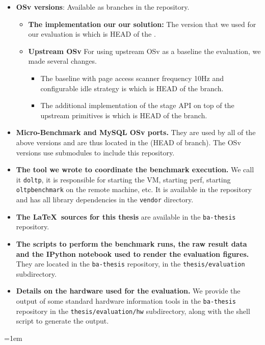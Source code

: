 \documentclass[12pt,a4paper]{book}
\begin{document}
\begin{itemize}
    \item \textbf{OSv versions}:
        Available as branches in the  repository.
    \begin{itemize}
        \item \textbf{The implementation our our solution:}
            The version that we used for our evaluation is  which is HEAD of the .
        \item \textbf{Upstream OSv}
            For using upstream OSv as a baseline the evaluation, we made several changes.
            \begin{itemize}
                \item The baseline with page access scanner frequency 10Hz and configurable idle strategy is  which is HEAD of the  branch.

                \item The additional implementation of the stage API on top of the upstream primitives is  which is HEAD of the  branch.
            \end{itemize}
    \end{itemize}

    \item \textbf{Micro-Benchmark and MySQL OSv ports.}
        They are used by all of the above versions and are thus located in the  (HEAD of  branch).
        The OSv versions use submodules to include this repository.

    \item \textbf{The tool we wrote to coordinate the benchmark execution.}
        We call it \texttt{doltp}, it is responsible for starting the VM, starting perf, starting \texttt{oltpbenchmark} on the remote machine, etc.
        It is available in the  repository and has all library dependencies in the \texttt{vendor} directory.

    \item \textbf{The \LaTeX~sources for this thesis} are available in the \texttt{ba-thesis} repository.

    \item \textbf{The scripts to perform the benchmark runs, the raw result data and the IPython notebook used to render the evaluation figures.}
        They are located in the \texttt{ba-thesis} repository, in the \texttt{thesis/evaluation} subdirectory.

    \item \textbf{Details on the hardware used for the evaluation.}
        We provide the output of some standard hardware information tools in the \texttt{ba-thesis} repository in the \texttt{thesis/evaluation/hw} subdirectory, along with the shell script to generate the output.

\end{itemize}

\cleardoublepage
{}
{}
\emergencystretch=1em
\printbibliography
\end{document}
